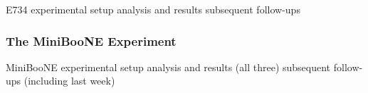     E734 experimental setup
    analysis and results
    subsequent follow-ups

    \subsubsection{The MiniBooNE Experiment}\label{sec:miniboonence}
    MiniBooNE experimental setup
    analysis and results (all three)
    subsequent follow-ups (including last week)



